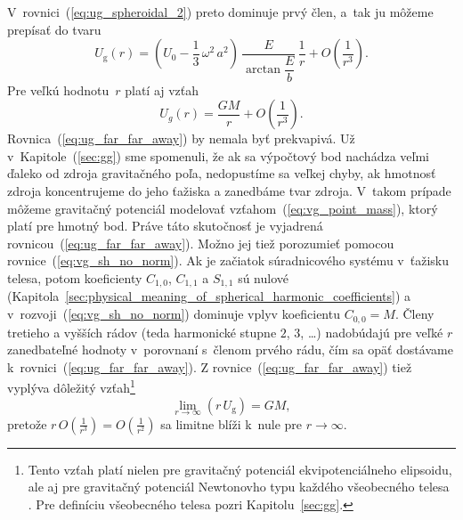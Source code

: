 \documentclass[a4paper,12pt]{book}
\newcommand{\gidx}{\mathrm g}
\begin{document}
V~rovnici~(\ref{eq:ug_spheroidal_2}) preto dominuje prvý člen, a~tak ju môžeme 
prepísať do tvaru
%
\begin{equation}
\label{eq:ug_spheroidal_3}
U_\gidx(r) = \left( U_0 - \frac{1}{3} \, \omega^2 \, a^2 \right) \, 
\frac{E}{\arctan\dfrac{E}{b}} \, \frac{1}{r} + O\left( \frac{1}{r^3} \right){.}
\end{equation}
%
Pre veľkú hodnotu~$r$ platí aj vzťah
%
\begin{equation}
\label{eq:ug_far_far_away}
U_g(r) = \frac{GM}{r} + O\left( \frac{1}{r^3}\right){.}
\end{equation}
%
Rovnica~(\ref{eq:ug_far_far_away}) by nemala byť prekvapivá.  Už 
v~Kapitole~(\ref{sec:gg}) sme spomenuli, že ak sa výpočtový bod nachádza veľmi 
ďaleko od zdroja gravitačného poľa, nedopustíme sa veľkej chyby, ak hmotnosť 
zdroja koncentrujeme do jeho ťažiska a zanedbáme tvar zdroja.  V~takom prípade 
môžeme gravitačný potenciál modelovať vzťahom~(\ref{eq:vg_point_mass}), ktorý 
platí pre hmotný bod.  Práve táto skutočnosť je vyjadrená 
rovnicou~(\ref{eq:ug_far_far_away}).  Možno jej tiež porozumieť pomocou 
rovnice~(\ref{eq:vg_sh_no_norm}).  Ak je začiatok súradnicového systému 
v~ťažisku telesa, potom koeficienty $C_{1,0}$, $C_{1,1}$ a $S_{1,1}$ sú nulové 
(Kapitola~\ref{sec:physical_meaning_of_spherical_harmonic_coefficients}) 
a v~rozvoji~(\ref{eq:vg_sh_no_norm}) dominuje vplyv koeficientu $C_{0,0} = M$.  
Členy tretieho a vyšších rádov (teda harmonické stupne $2$, $3$, \dots) 
nadobúdajú pre veľké $r$ zanedbateľné hodnoty v~porovnaní s~členom prvého rádu, 
čím sa opäť dostávame k~rovnici~(\ref{eq:ug_far_far_away}).  
Z rovnice~(\ref{eq:ug_far_far_away}) tiež vyplýva dôležitý vzťah\footnote{Tento 
vzťah platí nielen pre gravitačný potenciál ekvipotenciálneho elipsoidu, ale aj 
pre gravitačný potenciál Newtonovho typu každého všeobecného telesa 
\parencite{Jekeli2015}.  Pre definíciu všeobecného telesa pozri 
Kapitolu~\ref{sec:gg}.}
%
\begin{equation}
\lim_{r \rightarrow \infty} (r \, U_\gidx) = GM{,}
\end{equation}
%
pretože $r \, O \left( \frac{1}{r^3} \right) = O\left( \frac{1}{r^2} \right)$ 
sa limitne blíži k~nule pre $r \rightarrow \infty$.
\end{document}
